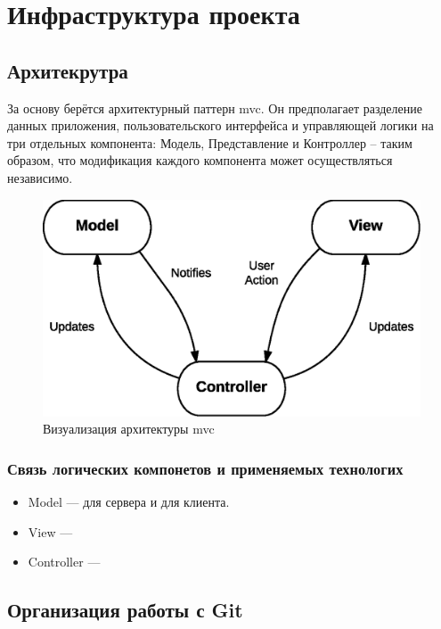 \section{Инфраструктура проекта}

\subsection{Архитекрутра}
За основу берётся архитектурный паттерн \acrshort{mvc}. Он предполагает разделение данных приложения, пользовательского интерфейса и управляющей логики на три отдельных компонента: Модель, Представление и Контроллер – таким образом, что модификация каждого компонента может осуществляться независимо.

\begin{figure}[h]
    \begin{center}
        \includegraphics[scale=0.7]{images/MVC-basic.eps}
    \end{center}
    \caption{Визуализация архитектуры \acrshort{mvc}}
\end{figure}

\subsubsection{Связь логических компонетов и применяемых технологих}
\begin{itemize}
    \item Model --- \textcite{seqorm} для сервера и \textcite{redux} для клиента.
    \item View --- \textcite{react}
    \item Controller --- \textcite{express}
\end{itemize}

\subsection{Организация работы с Git}
